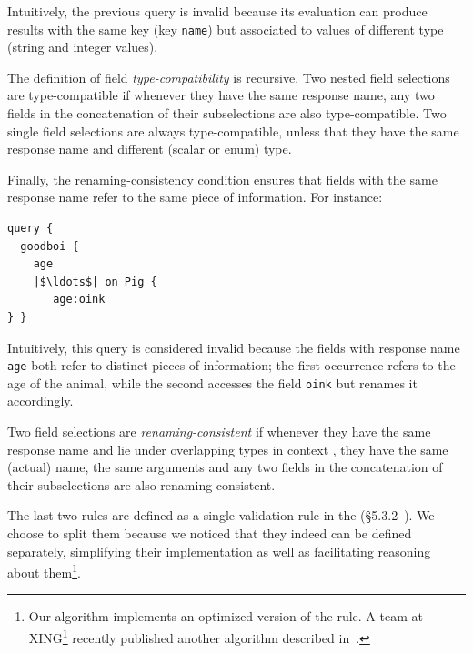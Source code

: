 Intuitively, the previous query is invalid because its evaluation can produce results with the same key 
(key \texttt{name}) but associated to values of different type (string and integer values).

The definition of field \emph{type-compatibility} is recursive. Two nested
field selections are type-compatible if whenever
they have the same response name, any two fields in the concatenation of their
subselections are also type-compatible. Two single field selections
are always type-compatible, unless that they have the same response
name and different (scalar or enum) type.

Finally, the renaming-consistency condition ensures that fields with
the same response name refer to the same piece of information. For
instance:
\begin{verbatim}
query {
  goodboi {
    age   
    |$\ldots$| on Pig {
       age:oink
} } 
\end{verbatim}

Intuitively, this query is considered invalid because the fields with response name \texttt{age} both refer to distinct pieces of information;
the first occurrence refers to the age of the animal, while the second accesses the field \texttt{oink} but renames it accordingly.


Two field selections are \emph{renaming-consistent} if whenever they have the
same response name and lie under overlapping types in context
,
they have the same (actual) name, the same arguments and any two
fields in the concatenation of their subselections are also
renaming-consistent.

The last two rules are defined as a single validation rule in the \spec (\cf\S5.3.2~\cite{gqlspec}). 
We choose to split them because we noticed that they indeed can be defined separately, simplifying their implementation as well as facilitating 
reasoning about them\footnote{Our algorithm implements an optimized version of the rule. A team at XING\footnote{https://www.xing.com/} recently published another algorithm described in~\cite{xingalg}.}.


